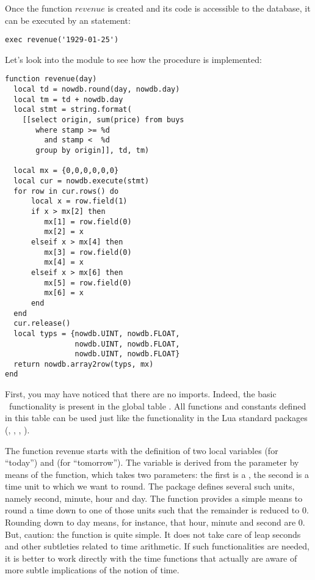 Once the function $revenue$ is created
and its code is accessible to the database, it
can be executed by an  statement:

\begin{sqlcode}
\begin{lstlisting}
exec revenue('1929-01-25')
\end{lstlisting}
\end{sqlcode}

\begin{minipage}{\textwidth}
Let's look into the module 
to see how the procedure is implemented:

\begin{lua}
\begin{lstlisting}
function revenue(day)
  local td = nowdb.round(day, nowdb.day)
  local tm = td + nowdb.day
  local stmt = string.format(
    [[select origin, sum(price) from buys
       where stamp >= %d
         and stamp <  %d
       group by origin]], td, tm)

  local mx = {0,0,0,0,0,0}
  local cur = nowdb.execute(stmt)
  for row in cur.rows() do
      local x = row.field(1)
      if x > mx[2] then
         mx[1] = row.field(0)
         mx[2] = x
      elseif x > mx[4] then
         mx[3] = row.field(0)
         mx[4] = x
      elseif x > mx[6] then 
         mx[5] = row.field(0)
         mx[6] = x
      end
  end
  cur.release()
  local typs = {nowdb.UINT, nowdb.FLOAT,
                nowdb.UINT, nowdb.FLOAT,
                nowdb.UINT, nowdb.FLOAT}
  return nowdb.array2row(typs, mx)
end
\end{lstlisting}
\end{lua}
\end{minipage}

First, you may have noticed that there are no imports.
Indeed, the basic \nowdb\ functionality is
present in the global table .
All functions and constants defined in
this table can be used just like the functionality
in the Lua standard packages (,
, , \etc).

The function revenue starts with
the definition of two local variables
 (for ``today'') and  (for ``tomorrow'').
The variable  is derived from the parameter
by means of the  function, which
takes two parameters: the first is a ,
the second is a time unit to which we want to round.
The  package defines several such units,
namely second, minute, hour and day.
The  function provides a simple means
to round a time down to one of those units
such that the remainder is reduced to 0.
Rounding down to day means, for instance,
that hour, minute and second are 0.
But, caution: the function is quite simple.
It does not take care of leap seconds and other
subtleties related to time arithmetic. If such
functionalities are needed, it is better to work
directly with the  time functions
that actually are aware of more subtle implications
of the notion of time.

